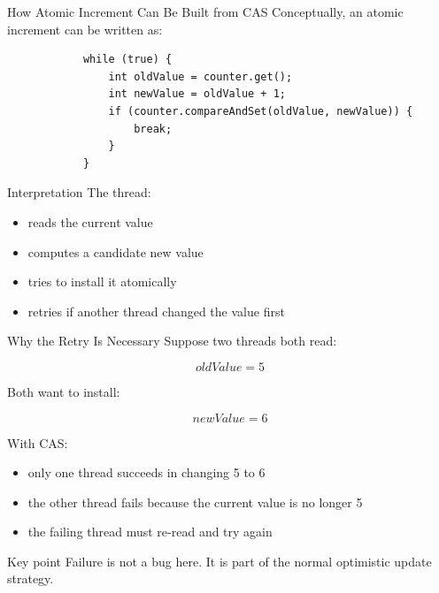 \documentclass[aspectratio=169,11pt]{beamer}
\begin{document}
	\begin{frame}[fragile]{How Atomic Increment Can Be Built from CAS}
		Conceptually, an atomic increment can be written as:
		
		\begin{lstlisting}
			while (true) {
				int oldValue = counter.get();
				int newValue = oldValue + 1;
				if (counter.compareAndSet(oldValue, newValue)) {
					break;
				}
			}
		\end{lstlisting}
		
		\vspace{0.35cm}
		
		\begin{exampleblock}{Interpretation}
			The thread:
			\begin{itemize}
				\item reads the current value
				\item computes a candidate new value
				\item tries to install it atomically
				\item retries if another thread changed the value first
			\end{itemize}
		\end{exampleblock}
	\end{frame}
	
	\begin{frame}{Why the Retry Is Necessary}
		Suppose two threads both read:
		
		\[
		oldValue = 5
		\]
		
		Both want to install:
		
		\[
		newValue = 6
		\]
		
		\vspace{0.35cm}
		
		With CAS:
		\begin{itemize}
			\item only one thread succeeds in changing 5 to 6
			\item the other thread fails because the current value is no longer 5
			\item the failing thread must re-read and try again
		\end{itemize}
		
		\vspace{0.35cm}
		
		\begin{alertblock}{Key point}
			Failure is not a bug here.  
			It is part of the normal optimistic update strategy.
		\end{alertblock}
	\end{frame}
	
\end{document}
